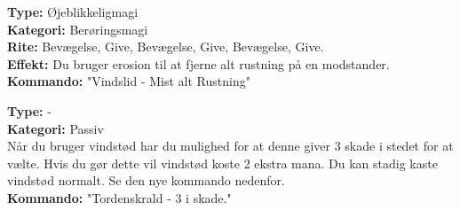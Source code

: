 \begin{vind*}[Vindslid]
\textbf{Type:} Øjeblikkeligmagi\\
\textbf{Kategori:} Berøringsmagi\\
\textbf{Rite:} Bevægelse, Give, Bevægelse, Give, Bevægelse, Give.\\
\textbf{Effekt:} Du bruger erosion til at fjerne alt rustning på en modstander.\\
\textbf{Kommando:} "Vindslid - Mist alt Rustning"
\end{vind*}

\begin{vind*}[Tordenskrald]
\textbf{Type:} -\\
\textbf{Kategori:} Passiv\\
Når du bruger vindstød har du mulighed for at denne giver 3 skade i stedet for at vælte. Hvis du gør dette vil vindstød koste 2 ekstra mana. Du kan stadig kaste vindstød normalt. Se den nye kommando nedenfor.\\
\textbf{Kommando:} "Tordenskrald - 3 i skade."
\end{vind*}